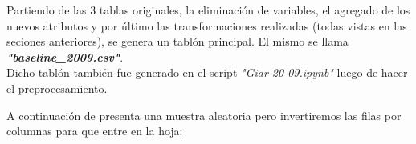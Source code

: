 Partiendo de las 3 tablas originales, la eliminación de variables, el agregado de los nuevos atributos y por último las transformaciones realizadas (todas vistas en las seciones anteriores), se genera un tablón principal. El mismo se llama \textbf{\textit{"baseline\_2009.csv"}}. \\

Dicho tablón también fue generado en el script \textit{"Giar 20-09.ipynb"} luego de hacer el preprocesamiento.

A continuación de presenta una muestra aleatoria pero invertiremos las filas por columnas para que entre en la hoja:










